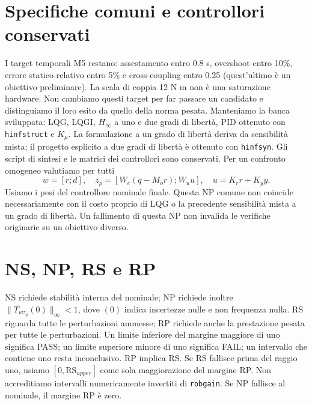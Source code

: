 \section{Specifiche comuni e controllori conservati}
I target temporali M5 restano: assestamento entro 0.8 s, overshoot entro
10\%, errore statico relativo entro 5\% e cross-coupling entro 0.25
(quest'ultimo è un obiettivo preliminare). La scala di coppia 12 N m
non è una saturazione hardware. Non cambiamo questi target per far passare
un candidato e distinguiamo il loro esito da quello della norma pesata.
Manteniamo la banca sviluppata: LQG, LQGI, $H_\infty$ a uno e due gradi
di libertà, PID ottenuto con \texttt{hinfstruct} e $K_\mu$. La formulazione
a un grado di libertà deriva da sensibilità mista; il progetto esplicito
a due gradi di libertà è ottenuto con \texttt{hinfsyn}. Gli script di
sintesi e le matrici dei controllori sono conservati.
Per un confronto omogeneo valutiamo per tutti
\[
w=[r;d],\quad z_p=[W_e(q-M_or);W_uu],\quad u=K_rr+K_yy.
\]
Usiamo i pesi del controllore nominale finale. Questa NP comune non coincide
necessariamente con il costo proprio di LQG o la precedente sensibilità
mista a un grado di libertà. Un fallimento di questa NP non invalida
le verifiche originarie su un obiettivo diverso.
\section{NS, NP, RS e RP}
NS richiede stabilità interna del nominale; NP richiede inoltre
$\|T_{wz_p}(0)\|_\infty<1$, dove $(0)$ indica incertezze nulle e non
frequenza nulla. RS riguarda tutte le perturbazioni ammesse; RP richiede
anche la prestazione pesata per tutte le perturbazioni.
Un limite inferiore del margine maggiore di uno significa PASS; un limite
superiore minore di uno significa FAIL; un intervallo che contiene uno
resta inconclusivo. RP implica RS. Se RS fallisce prima del raggio uno,
usiamo $[0,\mathrm{RS}_{upper}]$ come sola maggiorazione del margine RP.
Non accreditiamo intervalli numericamente invertiti di \texttt{robgain}.
Se NP fallisce al nominale, il margine RP è zero.
